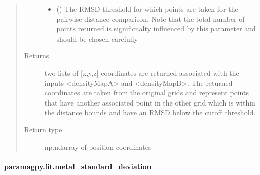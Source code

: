 \documentclass[a4paper,10pt,english,openany,oneside]{sphinxmanual}
\begin{document}
\begin{fulllineitems}
\begin{quote}
\begin{description}
\begin{itemize}
\item {} 
\sphinxAtStartPar
{} () \textendash{} The RMSD threshold for which points are taken
for the pairwise distance comparison.
Note that the total number of points returned
is significnalty influenced by this parameter
and should be chosen carefully

\end{itemize}

\item[{Returns}] \leavevmode
\sphinxAtStartPar
{} \textendash{} two lists of {[}x,y,z{]} coordinates are returned associated
with the inputs \textless{}densityMapA\textgreater{} and \textless{}densityMapB\textgreater{}.
The returned coordinates are taken from the original grids
and represent points that have another associated point in
the other grid which is within the distance bounds and
have an RMSD below the cutoff threshold.

\item[{Return type}] \leavevmode
\sphinxAtStartPar
np.ndarray of position coordinates

\end{description}\end{quote}

\end{fulllineitems}



\paragraph{paramagpy.fit.metal\_standard\_deviation}
\label{\detokenize{reference/generated/paramagpy.fit.metal_standard_deviation:paramagpy-fit-metal-standard-deviation}}\label{\detokenize{reference/generated/paramagpy.fit.metal_standard_deviation::doc}}
\end{document}

